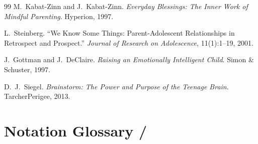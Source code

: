 \documentclass[11pt,a4paper]{article}
\begin{document}
\begin{thebibliography}{99}
M.~Kabat-Zinn and J.~Kabat-Zinn. \textit{Everyday Blessings: The Inner Work of Mindful Parenting}. Hyperion, 1997.

L.~Steinberg. ``We Know Some Things: Parent-Adolescent Relationships in Retrospect and Prospect.'' \textit{Journal of Research on Adolescence}, 11(1):1--19, 2001.

J.~Gottman and J.~DeClaire. \textit{Raising an Emotionally Intelligent Child}. Simon \& Schuster, 1997.

D.~J.~Siegel. \textit{Brainstorm: The Power and Purpose of the Teenage Brain}. TarcherPerigee, 2013.

\end{thebibliography}

\appendix
\section{Notation Glossary / }
\end{document}
